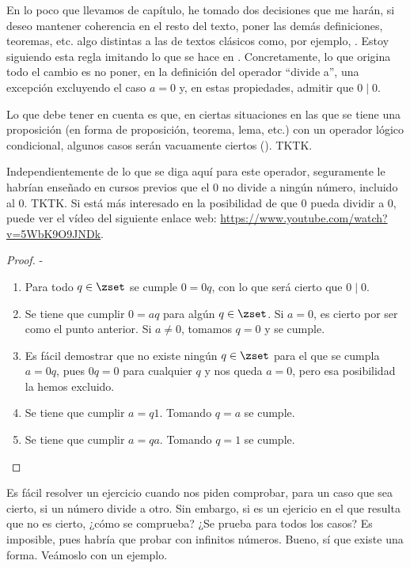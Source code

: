En lo poco que llevamos de capítulo, he tomado dos decisiones que me harán,
si deseo mantener coherencia en el resto del texto, poner las demás
definiciones, teoremas, etc. algo distintas a las de textos clásicos como,
por ejemplo, \cite{burton}. Estoy siguiendo esta regla
imitando lo que se hace en \cite{weissman}. Concretamente, lo
que origina todo el cambio es no poner, en la definición del operador
``divide a'', una excepción excluyendo el caso $a = 0$ y, en estas
propiedades, admitir que $0 \mid 0$.

Lo que debe tener en cuenta es que, en ciertas situaciones en las que se
tiene una proposición (en forma de proposición, teorema, lema, etc.) con un
operador lógico condicional, algunos casos serán vacuamente ciertos
(). TKTK.

Independientemente de lo que se diga aquí para este operador, seguramente le
habrían enseñado en cursos previos que el 0 no divide a ningún número,
incluido al 0. TKTK. Si está más interesado en la posibilidad de que 0 pueda
dividir a 0, puede ver el vídeo del siguiente enlace web:
\url{https://www.youtube.com/watch?v=5WbK9O9JNDk}.

\begin{proof}
  -

  \begin{enumerate}
    \item Para todo $q \in \zset$ se cumple $0 = 0q$, con lo que será
      cierto que $0 \mid 0$.

    \item Se tiene que cumplir $0 = aq$ para algún $q \in \zset$. Si $a =
      0$, es cierto por ser como el punto anterior. Si $a \neq 0$, tomamos
      $q = 0$ y se cumple.

    \item Es fácil demostrar que no existe ningún $q \in \zset$ para el que
      se cumpla $a = 0q$, pues $0q = 0$ para cualquier $q$ y nos queda $a =
      0$, pero esa posibilidad la hemos excluido.

    \item Se tiene que cumplir $a = q1$. Tomando $q = a$ se cumple.

    \item Se tiene que cumplir $a = qa$. Tomando $q = 1$ se
      cumple.\qedhere
    \end{enumerate}
\end{proof}

Es fácil resolver un ejercicio cuando nos piden comprobar, para un caso que
sea cierto, si un número divide a otro. Sin embargo, si es un ejericio en el
que resulta que no es cierto, ¿cómo se comprueba? ¿Se prueba para todos los
casos? Es imposible, pues habría que probar con infinitos números. Bueno, sí
que existe una forma. Veámoslo con un ejemplo.

